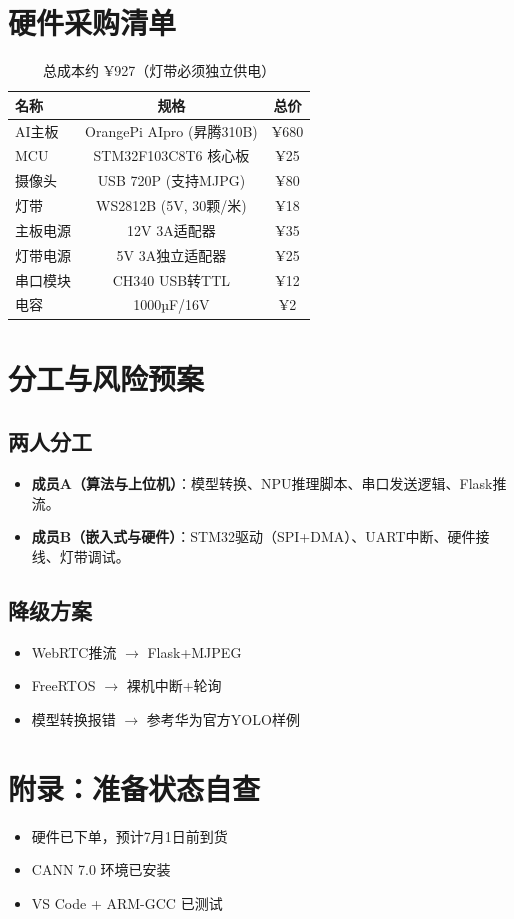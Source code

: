 \documentclass[a4paper,12pt]{article}
\begin{document}
\section{硬件采购清单}
\begin{table}[H]
\centering
\begin{tabular}{@{}lcc@{}}
\toprule
\textbf{名称} & \textbf{规格} & \textbf{总价} \\
\midrule
AI主板 & OrangePi AIpro (昇腾310B) & ¥680 \\
MCU & STM32F103C8T6 核心板 & ¥25 \\
摄像头 & USB 720P (支持MJPG) & ¥80 \\
灯带 & WS2812B (5V, 30颗/米) & ¥18 \\
主板电源 & 12V 3A适配器 & ¥35 \\
灯带电源 & 5V 3A独立适配器 & ¥25 \\
串口模块 & CH340 USB转TTL & ¥12 \\
电容 & 1000µF/16V & ¥2 \\
\bottomrule
\end{tabular}
\caption*{总成本约 ¥927（灯带必须独立供电）}
\end{table}

\section{分工与风险预案}
\subsection*{两人分工}
\begin{itemize}
    \item \textbf{成员A（算法与上位机）}：模型转换、NPU推理脚本、串口发送逻辑、Flask推流。
    \item \textbf{成员B（嵌入式与硬件）}：STM32驱动（SPI+DMA）、UART中断、硬件接线、灯带调试。
\end{itemize}

\subsection*{降级方案}
\begin{itemize}
    \item WebRTC推流 $\to$ Flask+MJPEG
    \item FreeRTOS $\to$ 裸机中断+轮询
    \item 模型转换报错 $\to$ 参考华为官方YOLO样例
\end{itemize}

\section*{附录：准备状态自查}
\begin{itemize}
    \item [ ] 硬件已下单，预计7月1日前到货
    \item [ ] CANN 7.0 环境已安装
    \item [ ] VS Code + ARM-GCC 已测试
\end{itemize}
\end{document}
